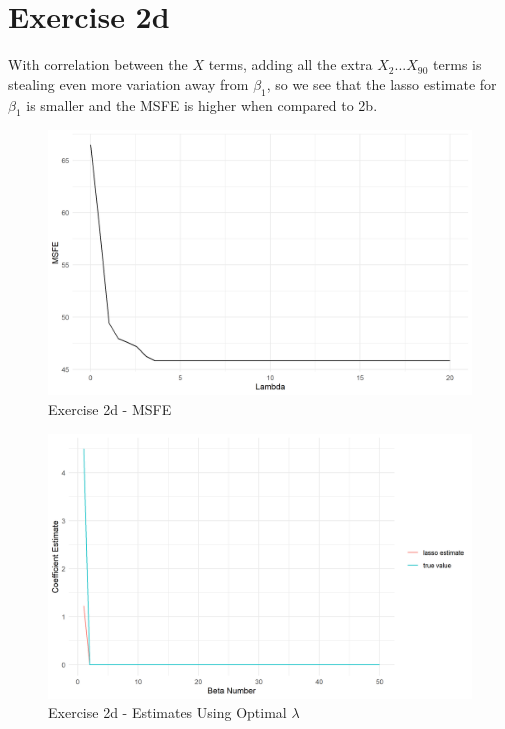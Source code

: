 \documentclass[reqno,12pt,notitlepage]{article}
\begin{document}
\section*{Exercise 2d}
With correlation between the $X$ terms, adding all the extra $X_2...X_{90}$ terms is stealing even more variation away from $\beta_1$, so we see that the lasso estimate for $\beta_1$ is smaller and the MSFE is higher when compared to 2b. 
\begin{figure}[!h]
    \centering
    \includegraphics[width=.8\textwidth]{lambda_2d.png}
    \caption{Exercise 2d - MSFE}
\end{figure}

\begin{figure}[!h]
    \centering
    \includegraphics[width=.8\textwidth]{estimates_2d.png}
    \caption{Exercise 2d - Estimates Using Optimal $\lambda$}
\end{figure}
\end{document}

